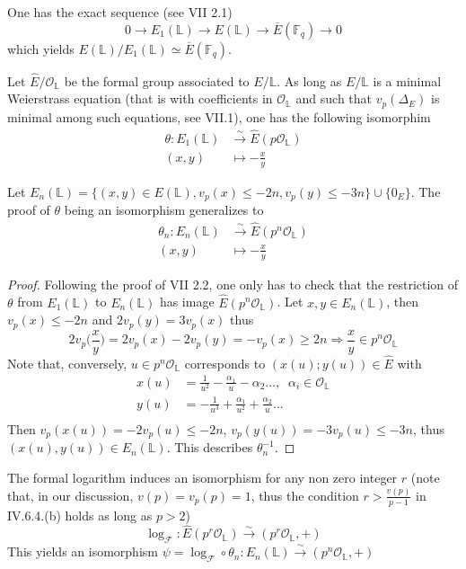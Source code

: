 \documentclass[10pt]{article}
\theoremstyle{definition}
\newcommand{\F}{\mathbb{F}}
\renewcommand{\L}{\mathbb{L}}
\begin{document}
\noindent One has the exact sequence (see \cite{Silverman:EC} VII 2.1)
\[ 0 \to E_1(\L) \to E(\L) \to \overline{E}(\F_q) \to 0 \]
which yields $E(\L) / E_1(\L) \simeq \overline{E}(\F_q)$.

Let $\hat{E} / \mathcal{O}_{\L}$ be the formal group associated to $E/\L$.
As long as $E/ \L$ is a minimal Weierstrass equation (that is with coefficients in $\mathcal{O}_{\L}$ and such that $v_p(\Delta_{E})$ is minimal among such equations, see \cite{Silverman:EC} VII.1), one has the following isomorphim 
\begin{align*} \theta : E_1(\L) &\xrightarrow{\sim} \hat{E}(p\mathcal{O}_{\L})\\
                   (x,y)& \mapsto - \frac{x}{y} 
\end{align*} 

\noindent Let $E_n(\L)= \lbrace (x,y) \in E(\L), v_p(x) \leq -2n, v_p(y) \leq -3n \rbrace \cup \lbrace 0_E \rbrace$.
The proof of $\theta$ being an isomorphism generalizes to 
\begin{align*} \theta_n : E_n(\L) &\xrightarrow{\sim} \hat{E}(p^n\mathcal{O}_{\L})\\
                   (x,y)& \mapsto - \frac{x}{y} 
\end{align*} 

\begin{proof}
Following the proof of \cite{Silverman:EC} VII 2.2, one only has to check that the restriction of $\theta$ from $E_1(\L)$ to $E_n(\L)$ has image  $\hat{E}(p^n\mathcal{O}_{\L})$.
Let $x,y \in E_n(\L)$, then $v_p(x) \leq -2n $ and $2v_p(y) = 3v_p(x)$ thus
\[ 2v_p\big(\frac{x}{y}\big) = 2 v_p(x) - 2v_p(y) = -v_p(x) \geq 2n  \Rightarrow \frac{x}{y} \in p^n\mathcal{O}_{\L} \]
Note that, conversely, $ u \in p^n \mathcal{O}_{\L}$ corresponds to $(x(u);y(u)) \in \hat{E}$ with
\begin{align*}
x(u) & = \frac{1}{u^2} - \frac{\alpha_1}{u} - \alpha_2 \dots , \; \; \alpha_i \in \mathcal{O}_{\L}\\
y(u) &= -\frac{1}{u^3} + \frac{\alpha_1}{u^2} + \frac{ \alpha_2}{u} \dots \\
\end{align*}
Then $v_p(x(u)) = -2v_p(u) \leq -2n$, $v_p(y(u)) = -3v_p(u) \leq -3n$, thus $(x(u),y(u)) \in E_n(\L)$.
This describes $\theta_n^{-1}$.
\end{proof}

\noindent The formal logarithm induces an isomorphism for any non zero integer $r$ (note that, in our discussion, $v(p) =v_p(p)= 1$, thus the condition $r > \frac{v(p)}{p-1}$ in \cite{Silverman:EC} IV.6.4.(b)  holds as long as $p > 2$) 
\[ \log_{\mathcal{F}} : \hat{E}(p^r\mathcal{O}_{\L}) \xrightarrow{\sim} (p^r\mathcal{O}_{\L},+) \]
This yields an isomorphism $\psi = \log_{\mathcal{F}} \circ \theta_n : E_n(\L) \xrightarrow{\sim} (p^n\mathcal{O}_{\L},+)$
\end{document}
